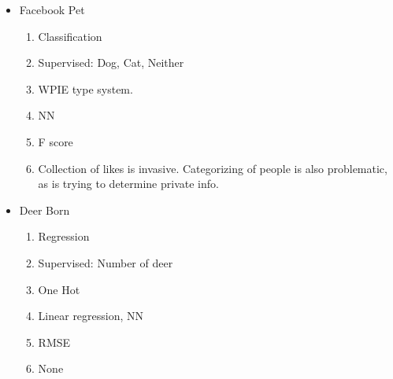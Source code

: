 \documentclass[letterpaper]{article}
\begin{document}
\begin{itemize}
\item Facebook Pet

\begin{enumerate}
\item Classification
\item Supervised: Dog, Cat, Neither
\item WPIE type system.
\item NN
\item F score\\
\item Collection of likes is invasive. Categorizing of people is also
problematic, as is trying to determine private info.
\end{enumerate}

\item Deer Born

\begin{enumerate}
\item Regression
\item Supervised: Number of deer
\item One Hot
\item Linear regression, NN
\item RMSE
\item None
\end{enumerate}
\end{itemize}
\end{document}

